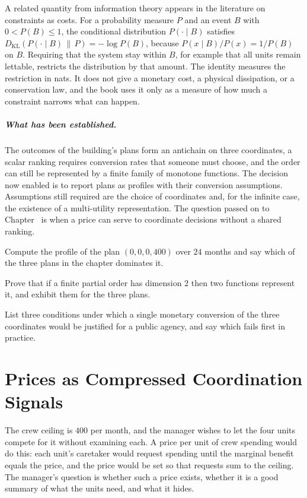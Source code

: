 A related quantity from information theory appears in the literature on constraints as costs. For a probability measure $P$ and an event $B$ with $0<P(B)\le 1$, the conditional distribution $P(\cdot\mid B)$ satisfies $D_{\mathrm{KL}}(P(\cdot\mid B)\,\|\,P)=-\log P(B)$, because $P(x\mid B)/P(x)=1/P(B)$ on $B$. Requiring that the system stay within $B$, for example that all units remain lettable, restricts the distribution by that amount. The identity measures the restriction in nats. It does not give a monetary cost, a physical dissipation, or a conservation law, and the book uses it only as a measure of how much a constraint narrows what can happen.

\paragraph{What has been established.} The outcomes of the building's plans form an antichain on three coordinates, a scalar ranking requires conversion rates that someone must choose, and the order can still be represented by a finite family of monotone functions. The decision now enabled is to report plans as profiles with their conversion assumptions. Assumptions still required are the choice of coordinates and, for the infinite case, the existence of a multi-utility representation. The question passed on to Chapter~ is when a price can serve to coordinate decisions without a shared ranking.

\begin{exercise}
Compute the profile of the plan $(0,0,0,400)$ over $24$ months and say which of the three plans in the chapter dominates it.
\end{exercise}
\begin{exercise}
Prove that if a finite partial order has dimension $2$ then two functions represent it, and exhibit them for the three plans.
\end{exercise}
\begin{exercise}
List three conditions under which a single monetary conversion of the three coordinates would be justified for a public agency, and say which fails first in practice.
\end{exercise}

\chapter{Prices as Compressed Coordination Signals}\label{ch:17}

The crew ceiling is $400$ per month, and the manager wishes to let the four units compete for it without examining each. A price per unit of crew spending would do this: each unit's caretaker would request spending until the marginal benefit equals the price, and the price would be set so that requests sum to the ceiling. The manager's question is whether such a price exists, whether it is a good summary of what the units need, and what it hides.

